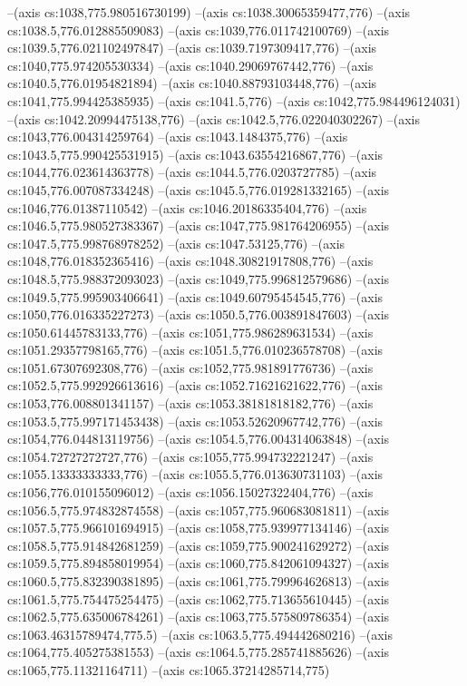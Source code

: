 --(axis cs:1038,775.980516730199)
--(axis cs:1038.30065359477,776)
--(axis cs:1038.5,776.012885509083)
--(axis cs:1039,776.011742100769)
--(axis cs:1039.5,776.021102497847)
--(axis cs:1039.7197309417,776)
--(axis cs:1040,775.974205530334)
--(axis cs:1040.29069767442,776)
--(axis cs:1040.5,776.01954821894)
--(axis cs:1040.88793103448,776)
--(axis cs:1041,775.994425385935)
--(axis cs:1041.5,776)
--(axis cs:1042,775.984496124031)
--(axis cs:1042.20994475138,776)
--(axis cs:1042.5,776.022040302267)
--(axis cs:1043,776.004314259764)
--(axis cs:1043.1484375,776)
--(axis cs:1043.5,775.990425531915)
--(axis cs:1043.63554216867,776)
--(axis cs:1044,776.023614363778)
--(axis cs:1044.5,776.0203727785)
--(axis cs:1045,776.007087334248)
--(axis cs:1045.5,776.019281332165)
--(axis cs:1046,776.01387110542)
--(axis cs:1046.20186335404,776)
--(axis cs:1046.5,775.980527383367)
--(axis cs:1047,775.981764206955)
--(axis cs:1047.5,775.998768978252)
--(axis cs:1047.53125,776)
--(axis cs:1048,776.018352365416)
--(axis cs:1048.30821917808,776)
--(axis cs:1048.5,775.988372093023)
--(axis cs:1049,775.996812579686)
--(axis cs:1049.5,775.995903406641)
--(axis cs:1049.60795454545,776)
--(axis cs:1050,776.016335227273)
--(axis cs:1050.5,776.003891847603)
--(axis cs:1050.61445783133,776)
--(axis cs:1051,775.986289631534)
--(axis cs:1051.29357798165,776)
--(axis cs:1051.5,776.010236578708)
--(axis cs:1051.67307692308,776)
--(axis cs:1052,775.981891776736)
--(axis cs:1052.5,775.992926613616)
--(axis cs:1052.71621621622,776)
--(axis cs:1053,776.008801341157)
--(axis cs:1053.38181818182,776)
--(axis cs:1053.5,775.997171453438)
--(axis cs:1053.52620967742,776)
--(axis cs:1054,776.044813119756)
--(axis cs:1054.5,776.004314063848)
--(axis cs:1054.72727272727,776)
--(axis cs:1055,775.994732221247)
--(axis cs:1055.13333333333,776)
--(axis cs:1055.5,776.013630731103)
--(axis cs:1056,776.010155096012)
--(axis cs:1056.15027322404,776)
--(axis cs:1056.5,775.974832874558)
--(axis cs:1057,775.960683081811)
--(axis cs:1057.5,775.966101694915)
--(axis cs:1058,775.939977134146)
--(axis cs:1058.5,775.914842681259)
--(axis cs:1059,775.900241629272)
--(axis cs:1059.5,775.894858019954)
--(axis cs:1060,775.842061094327)
--(axis cs:1060.5,775.832390381895)
--(axis cs:1061,775.799964626813)
--(axis cs:1061.5,775.754475254475)
--(axis cs:1062,775.713655610445)
--(axis cs:1062.5,775.635006784261)
--(axis cs:1063,775.575809786354)
--(axis cs:1063.46315789474,775.5)
--(axis cs:1063.5,775.494442680216)
--(axis cs:1064,775.405275381553)
--(axis cs:1064.5,775.285741885626)
--(axis cs:1065,775.11321164711)
--(axis cs:1065.37214285714,775)
